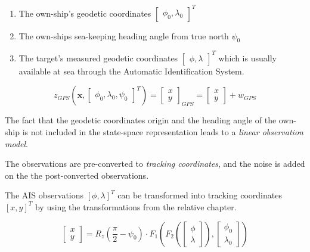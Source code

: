 \begin{enumerate}
\item The own-ship's geodetic coordinates $\begin{bmatrix}\phi_{0}, \lambda_{0} \end{bmatrix}^{T}$
\item The own-ships sea-keeping heading angle from true north $\psi_{\textit{0}}$
\item The target's measured geodetic coordinates $\begin{bmatrix}\phi, \lambda\end{bmatrix}^{T}$ which is usually available at sea through the Automatic Identification System.
\end{enumerate}




\begin{equation}
z_{GPS}(\mathbf{x},\begin{bmatrix}\phi_{0}, \lambda_{0}, \psi_{\textit{0}} \end{bmatrix}^{T}) = \begin{bmatrix}
x \\
y
\end{bmatrix}_{GPS} = \begin{bmatrix}
x \\
y
\end{bmatrix} + w_{GPS}
\end{equation}

The fact that the geodetic coordinates origin and the heading angle of the own-ship is not included in the state-space representation leads to a \emph{linear observation model}.

The observations are pre-converted to \emph{tracking coordinates}, and the noise is added on the the post-converted observations.

The AIS observations $[\phi, \lambda]^{T}$ can be transformed into tracking coordinates $[x,y]^{T}$ by using the transformations from the relative chapter.


\begin{equation}
\begin{bmatrix}
x \\
y
\end{bmatrix} = R_z(\frac{\pi}{2}-\psi_{\textit{0}}) \cdot F_1\left(F_2(\begin{bmatrix}
\phi \\
\lambda
\end{bmatrix}),\begin{bmatrix}
\phi_0 \\ \lambda_0
\end{bmatrix}\right)
\end{equation}

